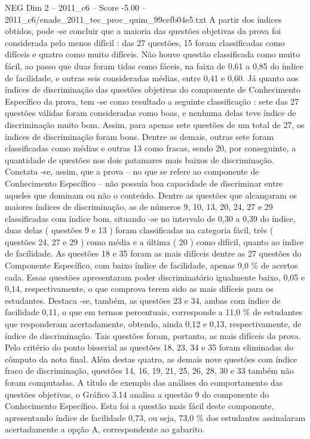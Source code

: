 \begin{textsample}{NEG Dim 2 – 2011\_c6 – Score -5.00 – 2011\_c6/enade\_2011\_tec\_proc\_quim\_99cefb04e5.txt}
A partir dos índices obtidos, pode -se concluir que a maioria das questões objetivas da prova foi considerada pelo menos difícil : das 27 questões, 15 foram classificadas como difíceis e quatro como muito difíceis.
Não houve questão classificada como muito fácil, ao passo que duas foram tidas como fáceis, na faixa de 0,61 a 0,85 do índice de facilidade, e outras seis consideradas médias, entre 0,41 e 0,60.
Já quanto aos índices de discriminação das questões objetivas do componente de Conhecimento Específico da prova, tem -se como resultado a seguinte classificação : sete das 27 questões válidas foram consideradas como boas, e nenhuma delas teve índice de discriminação muito bom.
Assim, para apenas sete questões de um total de 27, os índices de discriminação foram bons.
Dentre as demais, outras sete foram classificadas como médias e outras 13 como fracas, sendo 20, por conseguinte, a quantidade de questões nos dois patamares mais baixos de discriminação.
Constata -se, assim, que a prova – no que se refere ao componente de Conhecimento Específico – não possuía boa capacidade de discriminar entre aqueles que dominam ou não o conteúdo.
Dentre as questões que alcançaram os maiores índices de discriminação, as de números 9, 10, 13, 20, 24, 27 e 29 classificadas com índice bom, situando -se no intervalo de 0,30 a 0,39 do índice, duas delas ( questões 9 e 13 ) foram classificadas na categoria fácil, três ( questões 24, 27 e 29 ) como média e a última ( 20 ) como difícil, quanto ao índice de facilidade.
As questões 18 e 35 foram as mais difíceis dentre as 27 questões do Componente Específico, com baixo índice de facilidade, apenas 9,0 \% de acertos cada.
Essas questões apresentaram poder discriminatório igualmente baixo, 0,05 e 0,14, respectivamente, o que comprova terem sido as mais difíceis para os estudantes.
Destaca -se, também, as questões 23 e 34, ambas com índice de facilidade 0,11, o que em termos percentuais, corresponde a 11,0 \% de estudantes que responderam acertadamente, obtendo, ainda 0,12 e 0,13, respectivamente, de índice de discriminação.
Tais questões foram, portanto, as mais difíceis da prova.
Pelo critério do ponto bisserial as questões 18, 23, 34 e 35 foram eliminadas do cômputo da nota final.
Além destas quatro, as demais nove questões com índice fraco de discriminação, questões 14, 16, 19, 21, 25, 26, 28, 30 e 33 também não foram computadas.
A título de exemplo das análises do comportamento das questões objetivas, o Gráfico 3.14 analisa a questão 9 do componente do Conhecimento Específico.
Esta foi a questão mais fácil deste componente, apresentando índice de facilidade 0,73, ou seja, 73,0 \% dos estudantes assinalaram acertadamente a opção A, correspondente ao gabarito.

\end{textsample}
